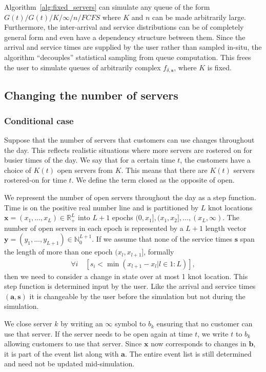 \documentclass[article]{jss}
\begin{document}
Algorithm~\ref{alg:fixed_servers} can simulate any queue of the form $G(t)/G(t)/K/\infty/n/\mathit{FCFS}$ where $K$ and $n$ can be made arbitrarily large. Furthermore, the inter-arrival and service distributions can be of completely general form and even have a dependency structure between them. Since the arrival and service times are supplied by the user rather than sampled in-situ, the algorithm ``decouples'' statistical sampling from queue computation. This frees the user to simulate queues of arbitrarily complex $f_{\delta, \mathbf{s}}$, where $K$ is fixed. 

\subsection{Changing the number of servers}

\subsubsection{Conditional case}

Suppose that the number of servers that customers can use changes throughout the day. This reflects realistic situations where more servers are rostered on for busier times of the day. We say that for a certain time $t$, the customers have a choice of $K(t)$ open servers from $K$. This means that there are $K(t)$ servers rostered-on for time $t$. We define the term closed as the opposite of open. 

We represent the number of open servers throughout the day as a step
function. Time is on the positive real number line and is partitioned
by $L$ knot locations
$\mathbf{x} = (x_1, \ldots, x_L ) \in \mathbb{R}^L_{+}$ into $L+1$
epochs $(0, x_1], (x_1, x_2], \ldots, (x_L, \infty)$. The number of
open servers in each epoch is represented by a $L+1$ length vector
$\mathbf{y} = (y_1, \ldots, y_{L+1} ) \in \mathbb{N}^{L+1}_0$. If we
assume that none of the service times $\mathbf{s}$ span the length of
more than one epoch $(x_{l}, x_{l+1}]$, formally
%
\begin{align}
\forall i \quad \left[ s_i < \min({ x_{l+1} - x_{l} | l \in 1:L }) \right] \label{eq:condition},
\end{align}
%
then we need to consider a change in state over at most 1 knot
location. This step function is determined input by the user. Like the
arrival and service times $\mathbf{(a,s)}$ it is changeable by the
user before the simulation but not during the simulation.

We close server $k$ by writing an $\infty$ symbol to $b_k$ ensuring that no customer can use that server. If the server needs to be open again at time $t$, we write $t$ to $b_k$ allowing customers to use that server. Since $\mathbf{x}$ now corresponds to changes in $\mathbf{b}$, it is part of the event list along with $\mathbf{a}$. The entire event list is still determined and need not be updated mid-simulation. 
\end{document}
